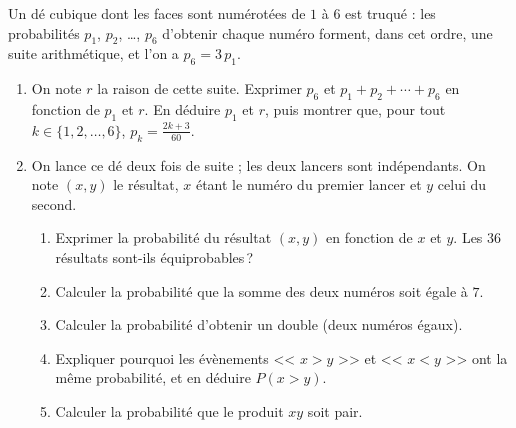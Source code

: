 %
\begin{exo}\label{exo:proba-12}
Un d\'e cubique dont les faces sont num\'erot\'ees de $1$ \`a $6$ est truqu\'e :
les probabilit\'es $p_1$, $p_2$, \ldots, $p_6$ d'obtenir chaque num\'ero forment, dans cet ordre,
une suite arithm\'etique, et l'on a $p_6 = 3\,p_1$.
\begin{enumerate}
\item On note $r$ la raison de cette suite. Exprimer $p_6$ et $p_1 + p_2 + \cdots + p_6$ en fonction de $p_1$ et $r$.
      En d\'eduire $p_1$ et $r$, puis montrer que, pour tout $k \in \{1,2,\ldots,6\}$, $p_k = \frac{2k+3}{60}$.
\item On lance ce d\'e deux fois de suite ; les deux lancers sont ind\'ependants.
      On note $(x,y)$ le r\'esultat, $x$ \'etant le num\'ero du premier lancer et $y$ celui du second.
      \begin{enumerate}
      \item Exprimer la probabilit\'e du r\'esultat $(x,y)$ en fonction de $x$ et $y$.
            Les $36$ r\'esultats sont-ils \'equiprobables\,?
      \item Calculer la probabilit\'e que la somme des deux num\'eros soit \'egale \`a $7$.
      \item Calculer la probabilit\'e d'obtenir un double (deux num\'eros \'egaux).
      \item Expliquer pourquoi les \'ev\`enements << $x > y$ >> et << $x < y$ >> ont la m\^eme probabilit\'e,
            et en d\'eduire $P(x > y)$.
      \item Calculer la probabilit\'e que le produit $xy$ soit pair.
      \end{enumerate}
\end{enumerate}
\end{exo}
%
